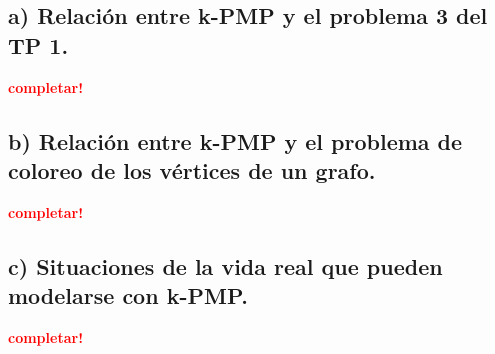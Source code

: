 \subsection{a) Relación entre k-PMP y el problema 3 del TP 1.}
\vspace*{0.3cm}
\textcolor{red}{\textbf{completar!}}



\newpage
\subsection{b) Relación entre k-PMP y el problema de coloreo de los vértices de
            un grafo.}
\vspace*{0.3cm}
\textcolor{red}{\textbf{completar!}}



\newpage
\subsection{c) Situaciones de la vida real que pueden modelarse con k-PMP.}
\vspace*{0.3cm}
\textcolor{red}{\textbf{completar!}}

